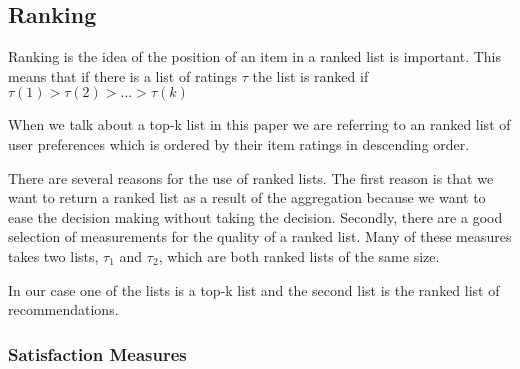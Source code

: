 \subsection{Ranking}\label{sec:ranking}
Ranking is the idea of the position of an item in a ranked list is important. This means that if there is a list of ratings $\tau$ the list is ranked if $\tau (1) > \tau (2) > ... > \tau (k)$

When we talk about a top-k list in this paper we are referring to an ranked list of user preferences which is ordered by their item ratings in descending order.

There are several reasons for the use of ranked lists. 
The first reason is that we want to return a ranked list as a result of the aggregation because we want to ease the decision making without taking the decision. 
Secondly, there are a good selection of measurements for the quality of a ranked list. Many of these measures takes two lists, $\tau_1$ and $\tau_2$, which are both ranked lists of the same size. 

In our case one of the lists is a top-k list and the second list is the ranked list of recommendations.

\subsubsection{Satisfaction Measures}

